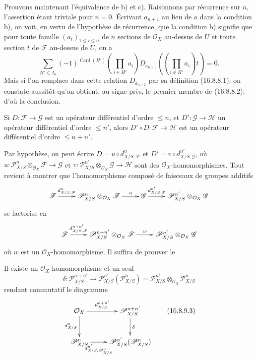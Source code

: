 Prouvons maintenant l'équivalence de b) et c). Raisonnons par récurrence sur
$n$, l'assertion étant triviale pour $n=0$. Écrivant $a_{n+1}$ au lieu de $a$
dans la condition b), on voit, en vertu de l'hypothèse de récurrence, que la
condition b) signifie que pour toute famille $(a_i)_{1\leq i\leq n}$ de $n$
sections de $\mathcal{O}_X$ au-dessus de $U$ et toute section $t$ de
$\mathscr{F}$ au-dessus de $U$, on a
\[
  \sum_{H'\subset I_n}(-1)^{\operatorname{Card}(H')}
  \left(\prod_{i\in H'}a_i\right)
  D_{a_{n+1}}\!\left(\left(\prod_{i\notin H'}a_i\right)t\right)=0.
\]
Mais si l'on remplace dans cette relation $D_{a_{n+1}}$ par sa définition
(16.8.8.1), on constate aussitôt qu'on obtient, au signe près, le premier
membre de (16.8.8.2); d'où la conclusion.

\begin{proposition}[16.8.9]
\label{IV.16.8.9}
Si $D:\mathscr{F}\to\mathscr{G}$ est un opérateur différentiel d'ordre
$\leq n$, et $D':\mathscr{G}\to\mathscr{H}$ un opérateur différentiel d'ordre
$\leq n'$, alors $D'\circ D:\mathscr{F}\to\mathscr{H}$ est un opérateur
différentiel d'ordre $\leq n+n'$.
\end{proposition}

Par hypothèse, on peut écrire $D=u\circ d_{X/S,\mathscr{F}}^n$ et
$D'=v\circ d_{X/S,\mathscr{G}}^{n'}$, où
$u:\mathscr{P}_{X/S}^n\otimes_{\mathcal{O}_X}\mathscr{F}\to\mathscr{G}$ et
$v:\mathscr{P}_{X/S}^{n'}\otimes_{\mathcal{O}_X}\mathscr{G}\to\mathscr{H}$
sont des $\mathcal{O}_X$-homomorphismes. Tout revient à montrer que
l'homomorphisme composé de faisceaux de groupes additifs
\[
  \xymatrix{
    \mathscr{F}\ar[r]^-{d_{X/S,\mathscr{F}}^n}
      &\mathscr{P}_{X/S}^n\otimes_{\mathcal{O}_X}\mathscr{F}
        \ar[r]^-u
      &\mathscr{G}\ar[r]^-{d_{X/S,\mathscr{G}}^{n'}}
      &\mathscr{P}_{X/S}^{n'}\otimes_{\mathcal{O}_X}\mathscr{G}
  }
\]
se factorise en
\[
  \xymatrix{
    \mathscr{F}\ar[r]^-{d_{X/S,\mathscr{F}}^{n+n'}}
      &\mathscr{P}_{X/S}^{n+n'}\otimes_{\mathcal{O}_X}\mathscr{F}
        \ar[r]^-w
      &\mathscr{P}_{X/S}^{n'}\otimes_{\mathcal{O}_X}\mathscr{G}
  }
\]
où $w$ est un $\mathcal{O}_X$-homomorphisme. Il suffira de prouver le

\begin{lemma}[16.8.9.1]
\label{IV.16.8.9.1}
Il existe un $\mathcal{O}_X$-homomorphisme et un seul
\[
  \delta:\mathscr{P}_{X/S}^{n+n'}
  \longrightarrow
  \mathscr{P}_{X/S}^{n'}(\mathscr{P}_{X/S}^n)
  =\mathscr{P}_{X/S}^{n'}\otimes_{\mathcal{O}_X}\mathscr{P}_{X/S}^n
  \tag{16.8.9.2}
  \label{IV.16.8.9.2}
\]
rendant commutatif le diagramme
\[
  \xymatrix{
    \mathcal{O}_X\ar[r]^-{d_{X/S}^{n+n'}}\ar[d]_-{d_{X/S}^n}
      &\mathscr{P}_{X/S}^{n+n'}\ar[d]^-\delta\\
    \mathscr{P}_{X/S}^n
      \ar[r]_-{d_{X/S,\mathscr{P}_{X/S}^n}^{n'}}
      &\mathscr{P}_{X/S}^{n'}(\mathscr{P}_{X/S}^n)
  }
  \tag{16.8.9.3}
  \label{IV.16.8.9.3}
\]
\end{lemma}

